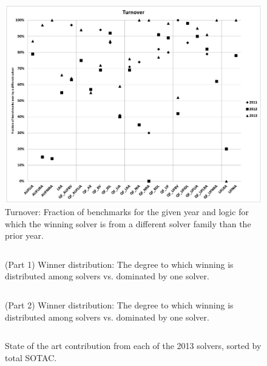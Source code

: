 \documentclass[smallcondensed]{svjour3}
\begin{document}
\begin{figure}
\centering
\includegraphics[width=\columnwidth]{turnover.pdf}
%
\caption{Turnover: Fraction of benchmarks for the given year and logic for which the winning solver is from a different solver family than the prior year.}
\label{Fig:turnover}
\end{figure}


\begin{figure}
\centering
\centering
\begin{tabular}{|ll|ccrrr|}
\hline

\end{tabular}
\caption{(Part 1) Winner distribution: The degree to which winning is distributed among solvers vs. dominated by one solver.}
\label{Fig:entropyA}
\end{figure}

\begin{figure}
\centering
\begin{tabular}{|ll|ccrrr|}
\hline

\end{tabular}
\caption{(Part 2) Winner distribution: The degree to which winning is distributed among solvers vs. dominated by one solver.}
\label{Fig:entropyB}
\end{figure}


\begin{figure}
\centering
\begin{tabular}{|l|rrr|}
\hline

\hline
\end{tabular}
\caption{State of the art contribution from each of the 2013 solvers, sorted by total SOTAC.}
\label{Fig:sotac}
\end{figure}
\end{document}
